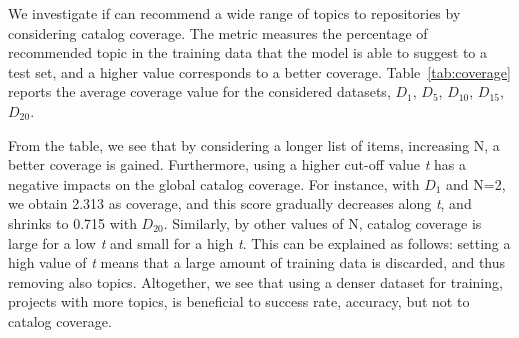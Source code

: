


We investigate if \TFa can recommend a wide range of topics to repositories by considering catalog coverage. The metric measures the percentage of recommended topic in the training data that the model is able to suggest to a test set, and a higher value corresponds to a better coverage. 
Table~\ref{tab:coverage} reports the average coverage value for the considered datasets, \ie $D_{1}$, $D_{5}$, $D_{10}$, $D_{15}$, $D_{20}$. %


From the table, we see that by considering a longer list of items, \ie increasing N, a better coverage is gained. Furthermore, using a higher cut-off value \emph{t} has a negative impacts on the global catalog coverage. For instance, with $D_{1}$ and N=2, we obtain 2.313 as coverage, and this score gradually decreases along \emph{t}, and shrinks to 0.715 with $D_{20}$. Similarly, by other values of N, catalog coverage is large for a low \emph{t} and small for a high \emph{t}. This can be explained as follows: setting a high value of \emph{t} means that a large amount of training data is discarded, and thus removing also topics. Altogether, we see that using a denser dataset for training, \ie projects with more topics, is beneficial to success rate, accuracy, but not to catalog coverage.


